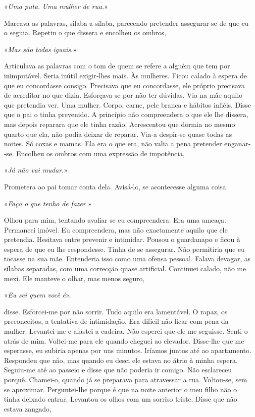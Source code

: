 «\emph{Uma puta. Uma mulher de rua.}»

Marcava as palavras, sílaba a sílaba, parecendo pretender asse­gurar­‑se
de que eu o seguia. Repetiu o que dissera e encolheu os ombros,

«\emph{Mas são todas iguais.}»

Articulava as palavras com o tom de quem se refere a alguém que tem por
inimputável. Seria inútil exigir­‑lhes mais. Às mulheres. Ficou calado à
espera de que eu concordasse consigo. Precisava que eu concordasse, ele
próprio precisava de acreditar no que dizia. Esforçava­‑se por não ter
dúvidas. Via na mãe aquilo que pretendia ver. Uma mulher. Corpo, carne,
pele branca e hábitos infiéis. Disse que o pai o tinha prevenido. A
princípio não compreendera o que ele lhe dissera, mas depois reparara
que ele tinha razão. Acrescentou que dormia no mesmo quarto que ela, não
podia deixar de reparar. Via­‑a despir­‑se quase todas as noites. Só
coxas e mamas. Ela era o que era, não valia a pena pretender
enganar­‑se. Encolheu os ombros com uma expressão de impotência,

«\emph{Já não vai mudar.}»

Prometera ao pai tomar conta dela. Avisá­‑lo, se acontecesse alguma
coisa.

«\emph{Faço o que tenho de fazer.}»

Olhou para mim, tentando avaliar se eu compreendera. Era uma ameaça.
Permaneci imóvel. Eu compreendera, mas não exactamente aquilo que ele
pretendia. Hesitava entre prevenir e intimidar. Pousou o guardanapo e
ficou à espera de que eu lhe respondesse. Tinha de se assegurar. Não
permitiria que eu tocasse na sua mãe. Entenderia isso como uma ofensa
pessoal. Falava devagar, as sílabas separadas, com uma correcção quase
artificial. Continuei calado, não me mexi. Ele manteve o olhar, mas
menos seguro,

«\emph{Eu sei quem você é}»,

disse. Esforcei­‑me por não sorrir. Tudo aquilo era lamentável. O rapaz,
os preconceitos, a tentativa de intimidação. Era difícil não ficar com
pena da mulher. Levantei­‑me e afastei a cadeira. Não esperei que ele me
seguisse. Senti­‑o atrás de mim. Voltei­‑me para ele quando cheguei ao
elevador. Disse­‑lhe que me esperasse, eu subiria apenas por uns
minutos. Iríamos juntos até ao apartamento. Respondeu que não, mas
quando eu desci ele estava no átrio à minha espera. Seguiu­‑me até ao
passeio e disse que não poderia ir comigo. Não esclareceu porquê.
Chamei­‑o, quando já se preparava para atravessar a rua. Voltou­‑se, sem
se aproximar. Perguntei­‑lhe porque é que na noite anterior o meu filho
não o tinha deixado entrar. Levantou os olhos com um sorriso triste.
Disse que não estava zangado,

